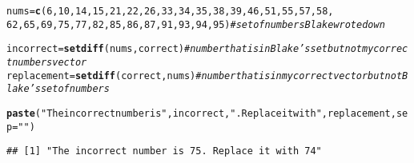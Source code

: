 \documentclass{article}\usepackage[]{graphicx}\usepackage[]{xcolor}
\makeatletter
\newcommand{\hlnum}[1]{\textcolor[rgb]{0.686,0.059,0.569}{#1}}%
\newcommand{\hlsng}[1]{\textcolor[rgb]{0.192,0.494,0.8}{#1}}%
\newcommand{\hlcom}[1]{\textcolor[rgb]{0.678,0.584,0.686}{\textit{#1}}}%
\newcommand{\hldef}[1]{\textcolor[rgb]{0.345,0.345,0.345}{#1}}%
\newcommand{\hlkwb}[1]{\textcolor[rgb]{0.69,0.353,0.396}{#1}}%
\newcommand{\hlkwc}[1]{\textcolor[rgb]{0.333,0.667,0.333}{#1}}%
\newcommand{\hlkwd}[1]{\textcolor[rgb]{0.737,0.353,0.396}{\textbf{#1}}}%
\newenvironment{kframe}{%
 \def\at@end@of@kframe{}%
 \ifinner\ifhmode%
  \def\at@end@of@kframe{\end{minipage}}%
  \begin{minipage}{\columnwidth}%
 \fi\fi%
 \def\FrameCommand##1{\hskip\@totalleftmargin \hskip-\fboxsep
 \colorbox{shadecolor}{##1}\hskip-\fboxsep
     \hskip-\linewidth \hskip-\@totalleftmargin \hskip\columnwidth}%
 \MakeFramed {\advance\hsize-\width
   \@totalleftmargin\z@ \linewidth\hsize
   \@setminipage}}%
 {\par\unskip\endMakeFramed%
 \at@end@of@kframe}
\newenvironment{knitrout}{}{} %
\makeatother
\begin{document}
\begin{enumerate}
\begin{knitrout}
\begin{kframe}
\begin{alltt}
\hldef{nums} \hlkwb{=} \hlkwd{c}\hldef{(}\hlnum{6}\hldef{,} \hlnum{10}\hldef{,} \hlnum{14}\hldef{,} \hlnum{15}\hldef{,} \hlnum{21}\hldef{,} \hlnum{22}\hldef{,} \hlnum{26}\hldef{,} \hlnum{33}\hldef{,} \hlnum{34}\hldef{,} \hlnum{35}\hldef{,} \hlnum{38}\hldef{,} \hlnum{39}\hldef{,} \hlnum{46}\hldef{,} \hlnum{51}\hldef{,} \hlnum{55}\hldef{,} \hlnum{57}\hldef{,} \hlnum{58}\hldef{,}
         \hlnum{62}\hldef{,} \hlnum{65}\hldef{,} \hlnum{69}\hldef{,} \hlnum{75}\hldef{,} \hlnum{77}\hldef{,} \hlnum{82}\hldef{,} \hlnum{85}\hldef{,} \hlnum{86}\hldef{,} \hlnum{87}\hldef{,} \hlnum{91}\hldef{,} \hlnum{93}\hldef{,} \hlnum{94}\hldef{,} \hlnum{95}\hldef{)} \hlcom{#set of numbers Blake wrote down}

\hldef{incorrect} \hlkwb{=} \hlkwd{setdiff}\hldef{(nums, correct)} \hlcom{#number that is in Blake's set but not my correct numbers vector}
\hldef{replacement} \hlkwb{=} \hlkwd{setdiff}\hldef{(correct, nums)} \hlcom{#number that is in my correct vector but not Blake's set of numbers}

\hlkwd{paste}\hldef{(}\hlsng{"The incorrect number is "}\hldef{, incorrect,} \hlsng{". Replace it with "}\hldef{, replacement,} \hlkwc{sep} \hldef{=} \hlsng{""}\hldef{)}
\end{alltt}
\begin{verbatim}
## [1] "The incorrect number is 75. Replace it with 74"
\end{verbatim}
\end{kframe}
\end{knitrout}
\end{enumerate}


\end{document}
